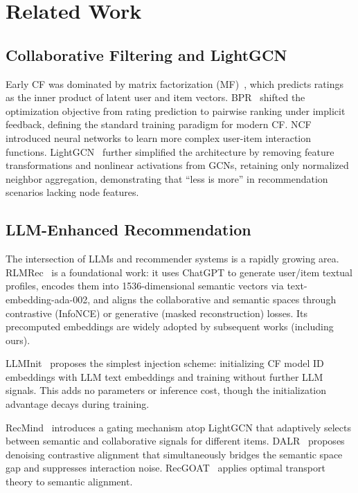 \documentclass[11pt,a4paper]{article}
\begin{document}
\section{Related Work}

\subsection{Collaborative Filtering and LightGCN}

Early CF was dominated by matrix factorization (MF)~\cite{Koren2009}, which predicts ratings as the inner product of latent user and item vectors. BPR~\cite{Rendle2009} shifted the optimization objective from rating prediction to pairwise ranking under implicit feedback, defining the standard training paradigm for modern CF. NCF~\cite{He2017NCF} introduced neural networks to learn more complex user-item interaction functions. LightGCN~\cite{He2020LightGCN} further simplified the architecture by removing feature transformations and nonlinear activations from GCNs, retaining only normalized neighbor aggregation, demonstrating that ``less is more'' in recommendation scenarios lacking node features.

\subsection{LLM-Enhanced Recommendation}

The intersection of LLMs and recommender systems is a rapidly growing area. RLMRec~\cite{Ren2024RLMRec} is a foundational work: it uses ChatGPT to generate user/item textual profiles, encodes them into 1536-dimensional semantic vectors via text-embedding-ada-002, and aligns the collaborative and semantic spaces through contrastive (InfoNCE) or generative (masked reconstruction) losses. Its precomputed embeddings are widely adopted by subsequent works (including ours).

LLMInit~\cite{Zhang2025LLMInit} proposes the simplest injection scheme: initializing CF model ID embeddings with LLM text embeddings and training without further LLM signals. This adds no parameters or inference cost, though the initialization advantage decays during training.

RecMind~\cite{Xue2026RecMind} introduces a gating mechanism atop LightGCN that adaptively selects between semantic and collaborative signals for different items. DALR~\cite{Peng2024DALR} proposes denoising contrastive alignment that simultaneously bridges the semantic space gap and suppresses interaction noise. RecGOAT~\cite{Li2026RecGOAT} applies optimal transport theory to semantic alignment.
\end{document}
